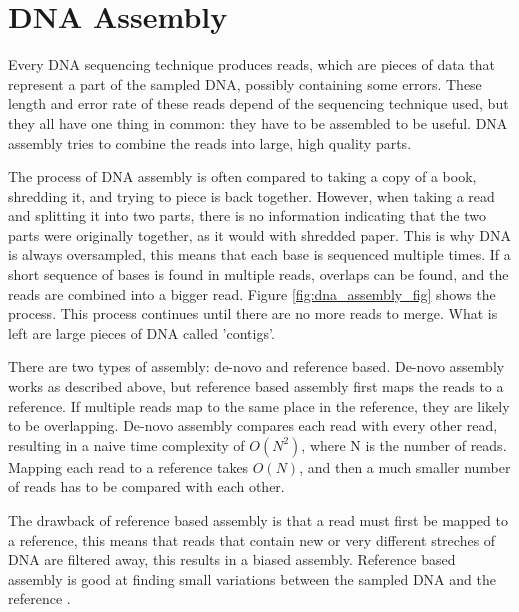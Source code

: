 \documentclass[../main/thesis.tex]{subfiles}
\begin{document}

\section{DNA Assembly}
Every DNA sequencing technique produces reads, which are pieces of data that represent a part of the sampled DNA, possibly containing some errors.
These length and error rate of these reads depend of the sequencing technique used, but they all have one thing in common: they have to be assembled to be useful.
DNA assembly tries to combine the reads into large, high quality parts.

The process of DNA assembly is often compared to taking a copy of a book, shredding it, and trying to piece is back together.
However, when taking a read and splitting it into two parts, there is no information indicating that the two parts were originally together, as it would with shredded paper.
This is why DNA is always oversampled, this means that each base is sequenced multiple times.
If a short sequence of bases is found in multiple reads, overlaps can be found, and the reads are combined into a bigger read.
Figure \ref{fig:dna_assembly_fig} shows the process.
This process continues until there are no more reads to merge.
What is left are large pieces of DNA called 'contigs'.


There are two types of assembly: de-novo and reference based.
De-novo assembly works as described above, but reference based assembly first maps the reads to a reference.
If multiple reads map to the same place in the reference, they are likely to be overlapping.
De-novo assembly compares each read with every other read, resulting in a naive time complexity of $O(N^2)$, where N is the number of reads.
Mapping each read to a reference takes $O(N)$, and then a much smaller number of reads has to be compared with each other.

The drawback of reference based assembly is that a read must first be mapped to a reference, this means that reads that contain new or very different streches of DNA are filtered away, this results in a biased assembly.
Reference based assembly is good at finding small variations between the sampled DNA and the reference \cite{denovo_vs_reference}.
\end{document}
